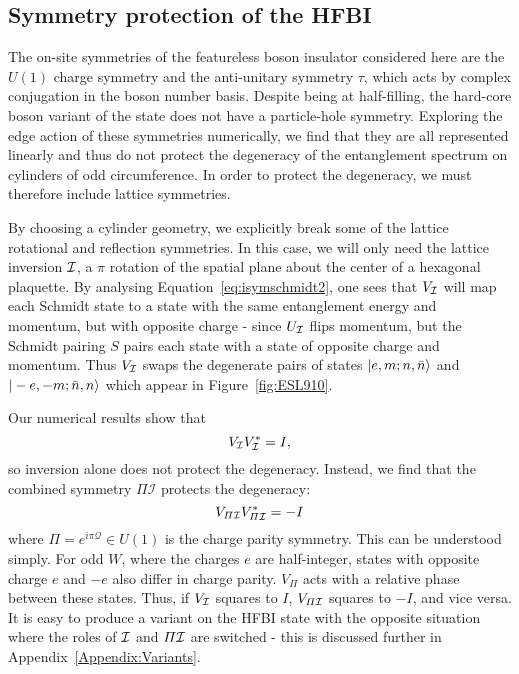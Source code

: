 \subsection{Symmetry protection of the HFBI}

The on-site symmetries of the featureless boson insulator considered here
are the $U(1)$ charge symmetry and the 
anti-unitary symmetry $\tau$, which acts by complex conjugation in the boson number basis.
Despite being at half-filling, the hard-core boson variant of the state does not have a particle-hole
symmetry. Exploring the edge action of these symmetries numerically, we find that they are all
represented linearly and thus do not protect the degeneracy of the entanglement spectrum
on cylinders of odd circumference.
In order to protect the degeneracy, we must therefore include lattice symmetries.

By choosing a cylinder geometry, we explicitly break some of the lattice rotational
and reflection symmetries. In this case, we will only need the lattice inversion $\mathcal{I}$,
a $\pi$ rotation of the spatial plane about the center of a hexagonal plaquette. 
By analysing Equation~\ref{eq:isymschmidt2}, one sees that $V_{\mathcal{I}}$ will map each Schmidt 
state to a state with the same entanglement energy and momentum, but with opposite charge -
since $U_{\mathcal{I}}$ flips momentum, but the Schmidt pairing $S$ pairs each state with a state of
opposite charge and momentum. 
Thus $V_{\mathcal{I}}$ swaps the degenerate pairs of states $\vert e, m; n, \bar{n} \rangle$ and
$\vert -e, -m; \bar{n}, n \rangle$ which appear in Figure~\ref{fig:ESL910}. 

Our numerical results show that 
$$
V_{\mathcal{I}} V_{\mathcal{I}}^* = I, 
$$
so inversion alone does not protect the degeneracy. Instead, we find that the
combined symmetry $\varPi \mathcal{I}$ protects the degeneracy:
$$
V_{\varPi \mathcal{I}} V_{\varPi \mathcal{I}}^* = -I 
$$
where $\varPi = e^{i \pi \mathcal{Q}} \in U(1)$ is the charge parity symmetry.
This can be understood simply. For odd $W$, where the charges $e$ are half-integer,
states with opposite charge $e$ and $-e$ also differ in charge parity. $V_{\varPi}$
acts with a relative phase between these states. Thus, if $V_{\mathcal{I}}$ squares
to $I$, $V_{\varPi \mathcal{I}}$ squares to $-I$, and vice versa. 
It is easy to produce a variant on the HFBI state with the opposite situation where
the roles of $\mathcal{I}$ and $\varPi \mathcal{I}$ are switched - this is discussed further in 
Appendix~\ref{Appendix:Variants}.

